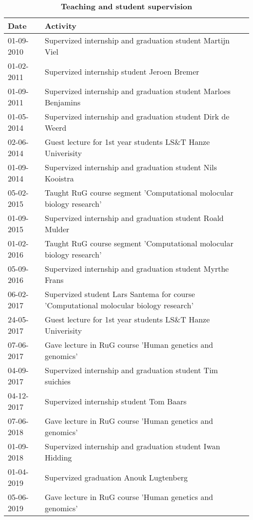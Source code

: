 \begin{appendices}
	\begin{table}
		\caption*{\textbf{Teaching and student supervision}}
		\footnotesize
		\begin{tabulary}{\linewidth}{LL}
			Date & Activity \\
			\hline		
			\rule{0pt}{2.6ex}\mbox{01-09-2010} & Supervized internship and graduation student Martijn Viel\\
			\rule{0pt}{2.6ex}\mbox{01-02-2011} & Supervized internship student Jeroen Bremer \\
			\rule{0pt}{2.6ex}\mbox{01-09-2011} & Supervized internship and graduation student Marloes Benjamins \\
			\rule{0pt}{2.6ex}\mbox{01-05-2014} & Supervized internship and graduation student Dirk de Weerd \\
			\rule{0pt}{2.6ex}\mbox{02-06-2014} & Guest lecture for 1st year students LS\&T Hanze Univerisity \\
			\rule{0pt}{2.6ex}\mbox{01-09-2014} & Supervized internship and graduation student Nils Kooistra \\
			\rule{0pt}{2.6ex}\mbox{05-02-2015} & Taught RuG course segment 'Computational molocular biology research'\\
			\rule{0pt}{2.6ex}\mbox{01-09-2015} & Supervized internship and graduation student Roald Mulder \\
			\rule{0pt}{2.6ex}\mbox{01-02-2016} & Taught RuG course segment 'Computational molocular biology research' \\
			\rule{0pt}{2.6ex}\mbox{05-09-2016} & Supervized internship and graduation student Myrthe Frans\\
			\rule{0pt}{2.6ex}\mbox{06-02-2017} & Supervized student Lars Santema for course 'Computational molocular biology research' \\
			\rule{0pt}{2.6ex}\mbox{24-05-2017} & Guest lecture for 1st year students LS\&T Hanze Univerisity \\
			\rule{0pt}{2.6ex}\mbox{07-06-2017} & Gave lecture in RuG course 'Human genetics and genomics' \\
			\rule{0pt}{2.6ex}\mbox{04-09-2017} & Supervized internship and graduation student Tim suichies \\
			\rule{0pt}{2.6ex}\mbox{04-12-2017} & Supervized internship student Tom Baars\\
			\rule{0pt}{2.6ex}\mbox{07-06-2018} & Gave lecture in RuG course 'Human genetics and genomics' \\
			\rule{0pt}{2.6ex}\mbox{01-09-2018} & Supervized internship and graduation student Iwan Hidding\\
			\rule{0pt}{2.6ex}\mbox{01-04-2019} & Supervized graduation Anouk Lugtenberg \\
			\rule{0pt}{2.6ex}\mbox{05-06-2019} & Gave lecture in RuG course 'Human genetics and genomics' \\
			\hline
		\end{tabulary}
		\label{table:appendix_activities_4}
	\end{table}
	

\end{appendices}
